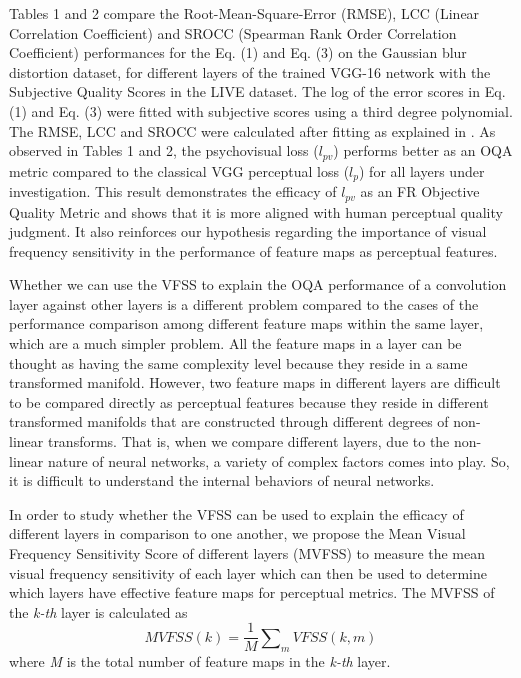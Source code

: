 \documentclass[10pt,twocolumn,letterpaper]{article}
\begin{document}
Tables 1 and 2 compare the Root-Mean-Square-Error (RMSE),  LCC (Linear Correlation Coefficient) and SROCC (Spearman Rank Order Correlation Coefficient) performances for the Eq. (1) and Eq. (3) on the Gaussian blur distortion dataset, for different layers of the trained VGG-16 network with the Subjective Quality Scores in the LIVE dataset. The log of the error scores in Eq. (1) and Eq. (3) were fitted with subjective scores using a third degree polynomial. The RMSE, LCC and SROCC were calculated after fitting as explained in \cite{4}. As observed in Tables 1 and 2, the psychovisual loss ($l_{pv}$) performs better as an OQA metric compared to the classical VGG perceptual loss ($l_{p}$) for all layers under investigation. This result demonstrates the efficacy of $l_{pv}$ as an FR Objective Quality Metric and shows that it is more aligned with human perceptual quality judgment. It also reinforces our hypothesis regarding the importance of visual frequency sensitivity in the performance of feature maps as perceptual features.

Whether we can use the VFSS to explain the OQA performance of a convolution layer against other layers is a different problem compared to the cases of the performance comparison among different feature maps within the same layer, which are a much simpler problem. All the feature maps in a layer can be thought as having the same complexity level because they reside in a same transformed manifold. However, two feature maps in different layers are difficult to be compared directly as perceptual features because they reside in different transformed manifolds that are constructed through different degrees of non-linear transforms. That is, when we compare different layers, due to the non-linear nature of neural networks, a variety of complex factors comes into play. So, it is difficult to understand the internal behaviors of neural networks.

In order to study whether the VFSS can be used to explain the efficacy of different layers in comparison to one another, we propose the Mean Visual Frequency Sensitivity Score of different layers (MVFSS) to measure the mean visual frequency sensitivity of each layer which can then be used to determine which layers have effective feature maps for perceptual metrics. The MVFSS of the \textit{k-th} layer is calculated as
\begin{equation}
   MVFSS(k)=\frac{1}{M}\sum\nolimits_{m}VFSS(k,m)
\end{equation}
where \textit{M} is the total number of feature maps in the \textit{k-th} layer.
\end{document}
